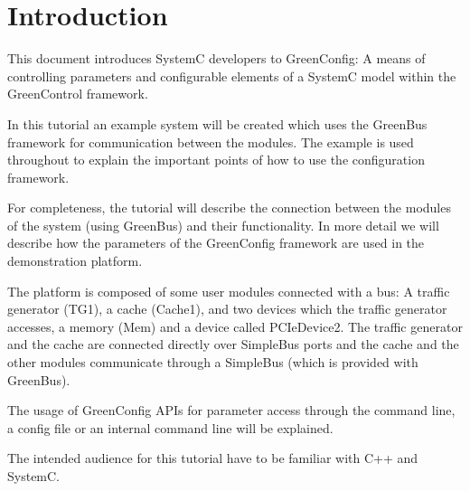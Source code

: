 
\section{Introduction}

This document introduces SystemC developers to GreenConfig: A means of
controlling parameters and configurable elements of a SystemC model
within the GreenControl framework.

In this tutorial an example system will be created which uses the GreenBus framework for
communication between the modules.  The example is used throughout to explain the important points of
how to use the configuration framework.

For completeness, the tutorial will describe the connection between the modules of the system (using
GreenBus) and their functionality. In more detail we will describe how the parameters of
the GreenConfig framework are used in the demonstration platform.

The platform is composed of some user modules connected with a bus: A traffic generator (TG1), a
cache (Cache1), and two devices which the traffic generator accesses, a memory (Mem) and a device
called PCIeDevice2. The traffic generator and the cache are connected directly over SimpleBus ports
and the cache and the other modules communicate through a SimpleBus (which is provided with GreenBus).

The usage of GreenConfig APIs for parameter access through the command line, a config file or an internal command line will be explained.

The intended audience for this tutorial have to be familiar with C++ and SystemC.